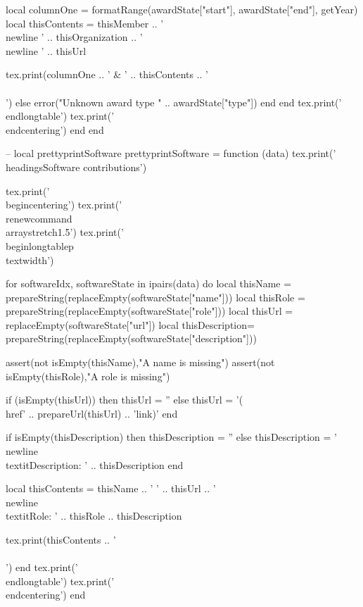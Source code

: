 \documentclass[letterpaper, 10pt]{article}
\newcommand{\headings}[1]{\section*{#1} \hrule \vspace{10pt}}
\begin{document}
\begin{luacode}
					local columnOne = formatRange(awardState["start"], awardState["end"], getYear)
					local thisContents = thisMember ..
										'\\newline ' .. thisOrganization ..
										'\\newline ' .. thisUrl

					tex.print(columnOne .. ' & ' .. thisContents .. ' \\\\')
				else
					error("Unknown award type " .. awardState["type"])
				end
			end
			tex.print('\\end{longtable}')
			tex.print('\\end{centering}')
		end
	end

	-- local prettyprintSoftware
	prettyprintSoftware = function (data)
		tex.print('\\headings{Software contributions}')

		tex.print('\\begin{centering}')
		tex.print('\\renewcommand{\\arraystretch}{1.5}')
		tex.print('\\begin{longtable}{p{\\textwidth}}')

		for softwareIdx, softwareState in ipairs(data) do
			local thisName		= prepareString(replaceEmpty(softwareState["name"]))
			local thisRole   	= prepareString(replaceEmpty(softwareState["role"]))
			local thisUrl    	= replaceEmpty(softwareState["url"])
			local thisDescription= prepareString(replaceEmpty(softwareState["description"]))

			assert(not isEmpty(thisName),"A name is missing")
			assert(not isEmpty(thisRole),"A role is missing")

			if (isEmpty(thisUrl)) then
				thisUrl = ''
			else
				thisUrl = '(\\href{' .. prepareUrl(thisUrl) .. '}{link})'
			end

			if isEmpty(thisDescription) then
				thisDescription = ''
			else
				thisDescription = '\\newline\\textit{Description: }' .. thisDescription
			end

			local thisContents = thisName .. ' ' .. thisUrl ..
								'\\newline\\textit{Role: }' .. thisRole ..
								thisDescription

			tex.print(thisContents .. ' \\\\')
		end
		tex.print('\\end{longtable}')
		tex.print('\\end{centering}')
	end


\end{luacode}
\end{document}

